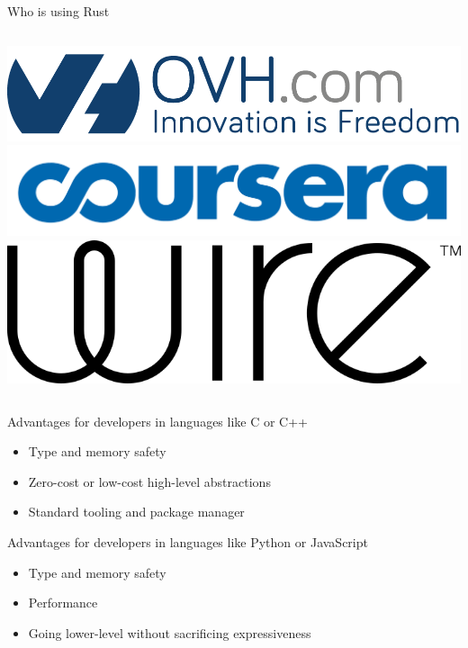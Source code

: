 \documentclass[12pt, aspectratio=169]{beamer}
\begin{document}
\begin{frame}{Who is using Rust}
  \begin{columns}
    \includegraphics[width=\textwidth]{images/ovh.png}
    \includegraphics[width=\textwidth]{images/coursera.png}
    \includegraphics[width=\textwidth]{images/wire.png}
  \end{columns}
\end{frame}

\begin{frame}{Advantages for developers in languages like C or C++}
  \begin{itemize}
    \item Type and memory safety
    \item Zero-cost or low-cost high-level abstractions
    \item Standard tooling and package manager
  \end{itemize}
\end{frame}

\begin{frame}{Advantages for developers in languages like Python or JavaScript}
  \begin{itemize}
    \item Type and memory safety
    \item Performance
    \item Going lower-level without sacrificing expressiveness
  \end{itemize}
\end{frame}
\end{document}
